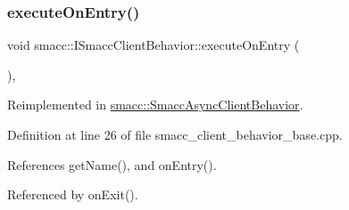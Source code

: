 \subsubsection{\texorpdfstring{execute\+On\+Entry()}{executeOnEntry()}}
{\footnotesize\ttfamily void smacc\+::\+I\+Smacc\+Client\+Behavior\+::execute\+On\+Entry (\begin{DoxyParamCaption}{ }\end{DoxyParamCaption})\hspace{0.3cm}{\ttfamily [protected]}, {\ttfamily [virtual]}}



Reimplemented in \hyperlink{classsmacc_1_1SmaccAsyncClientBehavior_ab8ca63d40d61554263466fe4c0b5cbd1}{smacc\+::\+Smacc\+Async\+Client\+Behavior}.



Definition at line 26 of file smacc\+\_\+client\+\_\+behavior\+\_\+base.\+cpp.



References get\+Name(), and on\+Entry().



Referenced by on\+Exit().


